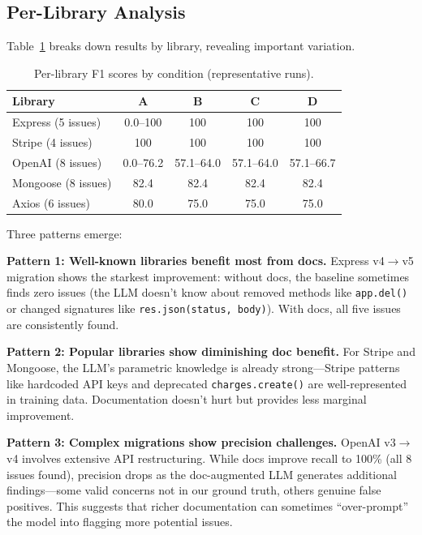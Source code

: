 \documentclass[sigconf,nonacm]{acmart}
\begin{document}
\subsection{Per-Library Analysis}

Table~\ref{tab:perlibrary} breaks down results by library, revealing important variation.

\begin{table}[h]
\centering
\caption{Per-library F1 scores by condition (representative runs).}
\label{tab:perlibrary}
\begin{tabular}{lcccc}
\hline
\textbf{Library} & \textbf{A} & \textbf{B} & \textbf{C} & \textbf{D} \\
\hline
Express (5 issues) & 0.0--100 & 100 & 100 & 100 \\
Stripe (4 issues) & 100 & 100 & 100 & 100 \\
OpenAI (8 issues) & 0.0--76.2 & 57.1--64.0 & 57.1--64.0 & 57.1--66.7 \\
Mongoose (8 issues) & 82.4 & 82.4 & 82.4 & 82.4 \\
Axios (6 issues) & 80.0 & 75.0 & 75.0 & 75.0 \\
\hline
\end{tabular}
\end{table}

Three patterns emerge:

\textbf{Pattern 1: Well-known libraries benefit most from docs.} Express v4$\rightarrow$v5 migration shows the starkest improvement: without docs, the baseline sometimes finds zero issues (the LLM doesn't know about removed methods like \texttt{app.del()} or changed signatures like \texttt{res.json(status, body)}). With docs, all five issues are consistently found.

\textbf{Pattern 2: Popular libraries show diminishing doc benefit.} For Stripe and Mongoose, the LLM's parametric knowledge is already strong---Stripe patterns like hardcoded API keys and deprecated \texttt{charges.create()} are well-represented in training data. Documentation doesn't hurt but provides less marginal improvement.

\textbf{Pattern 3: Complex migrations show precision challenges.} OpenAI v3$\rightarrow$v4 involves extensive API restructuring. While docs improve recall to 100\% (all 8 issues found), precision drops as the doc-augmented LLM generates additional findings---some valid concerns not in our ground truth, others genuine false positives. This suggests that richer documentation can sometimes ``over-prompt'' the model into flagging more potential issues.
\end{document}
